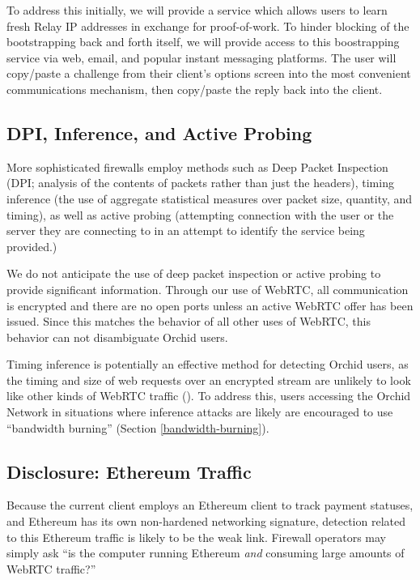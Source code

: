 \documentclass{article}
\newcommand{\orchid}{Orchid}
\newcommand{\Orchid}{\orchid}
\begin{document}
To address this initially, we will provide a service which allows
users to learn fresh Relay IP addresses in exchange for proof-of-work.
To hinder blocking of the bootstrapping back and forth itself, we will
provide access to this boostrapping service via web, email, and
popular instant messaging platforms. The user will copy/paste a
challenge from their client's options screen into the most convenient
communications mechanism, then copy/paste the reply back into the
client.

\subsection{DPI, Inference, and Active Probing}

More sophisticated firewalls employ methods such as Deep Packet
Inspection (DPI; analysis of the contents of packets rather than just
the headers), timing inference (the use of aggregate statistical
measures over packet size, quantity, and timing), as well as active
probing (attempting connection with the user or the server they are
connecting to in an attempt to identify the service being provided.)

We do not anticipate the use of deep packet inspection or active
probing to provide significant information. Through our use of WebRTC,
all communication is encrypted and there are no open ports unless an
active WebRTC offer has been issued. Since this matches the behavior
of all other uses of WebRTC, this behavior can not disambiguate \Orchid{}
users.

Timing inference is potentially an effective method for detecting
\Orchid{} users, as the timing and size of web requests over an encrypted
stream are unlikely to look like other kinds of WebRTC traffic
(). To address this, users accessing the \Orchid{} Network
in situations where inference attacks are likely are encouraged to use
``bandwidth burning'' (Section \ref{bandwidth-burning}).

\subsection{Disclosure: Ethereum Traffic}

Because the current client employs an Ethereum client to track payment
statuses, and Ethereum has its own non-hardened networking signature,
detection related to this Ethereum traffic is likely to be the weak
link. Firewall operators may simply ask ``is the computer running
Ethereum \emph{and} consuming large amounts of WebRTC traffic?''
\end{document}
